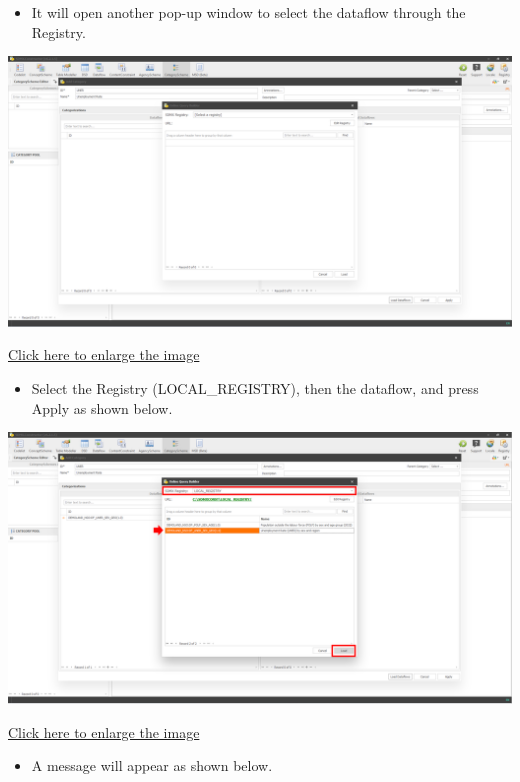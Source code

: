 \documentclass[
]{book}
\providecommand{\tightlist}{%
  \setlength{\itemsep}{0pt}\setlength{\parskip}{0pt}}
\begin{document}
\begin{itemize}
\tightlist
\item
  It will open another pop-up window to select the dataflow through the Registry.
\end{itemize}

\begin{center}\includegraphics[width=1\linewidth]{./images/image168} \end{center}

\href{images/image168.png}{Click here to enlarge the image}

\begin{itemize}
\tightlist
\item
  Select the Registry (LOCAL\_REGISTRY), then the dataflow, and press Apply as shown below.
\end{itemize}

\begin{center}\includegraphics[width=1\linewidth]{./images/image170} \end{center}

\href{images/image170.png}{Click here to enlarge the image}

\begin{itemize}
\tightlist
\item
  A message will appear as shown below.
\end{itemize}
\end{document}

